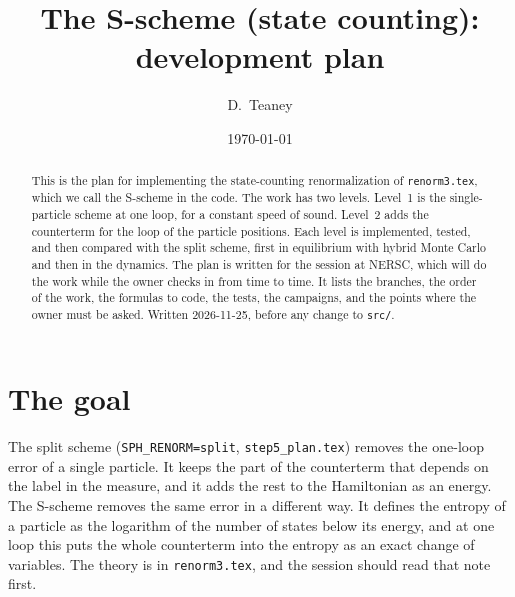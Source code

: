 \documentclass[11pt,aps,preprint,nofootinbib,superscriptaddress,tightenlines]{revtex4-2}
\begin{document}
\sloppy

\title{The S-scheme (state counting): development plan}
\author{D.~Teaney}
\date{\today}

\begin{abstract}
This is the plan for implementing the state-counting renormalization of \nolinkurl{renorm3.tex}, which we call the S-scheme in the code.  The work has
two levels.  Level~1 is the single-particle scheme at one loop, for a constant speed of sound.  Level~2 adds the counterterm for the loop of the
particle positions.  Each level is implemented, tested, and then compared with the split scheme, first in equilibrium with hybrid Monte Carlo and then
in the dynamics.  The plan is written for the session at NERSC, which will do the work while the owner checks in from time to time.  It lists the
branches, the order of the work, the formulas to code, the tests, the campaigns, and the points where the owner must be asked.  Written 2026-11-25,
before any change to \nolinkurl{src/}.
\end{abstract}

\maketitle
\tableofcontents

\section{The goal}
\label{sec:goal}

The split scheme (\texttt{SPH\_RENORM=split}, \nolinkurl{step5_plan.tex}) removes the one-loop error of a single particle.  It keeps the part of the
counterterm that depends on the label in the measure, and it adds the rest to the Hamiltonian as an energy.  The S-scheme removes the same error in a
different way.  It defines the entropy of a particle as the logarithm of the number of states below its energy, and at one loop this puts the whole
counterterm into the entropy as an exact change of variables.  The theory is in \nolinkurl{renorm3.tex}, and the session should read that note first.
\end{document}
